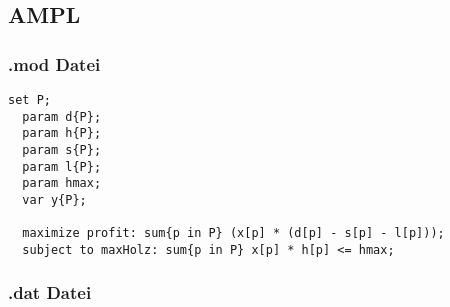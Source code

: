 \documentclass[a4paper,11pt]{article}
\begin{document}
\subsection*{AMPL}

\subsubsection*{.mod Datei}

\begin{lstlisting}[]
  set P;
  param d{P};
  param h{P};
  param s{P};
  param l{P};
  param hmax;
  var y{P};

  maximize profit: sum{p in P} (x[p] * (d[p] - s[p] - l[p]));
  subject to maxHolz: sum{p in P} x[p] * h[p] <= hmax;
\end{lstlisting}

\vspace{10mm}

\subsubsection*{.dat Datei}

\begin{lstlisting}[]

\end{lstlisting}
\end{document}
